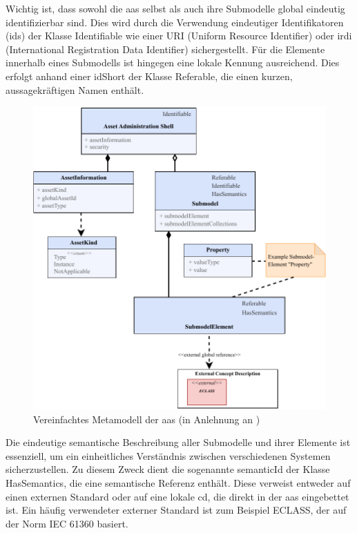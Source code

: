 Wichtig ist, dass sowohl die \acs{aas} selbst als auch ihre Submodelle global eindeutig identifizierbar sind.
Dies wird durch die Verwendung eindeutiger Identifikatoren (\acsp{id}) der Klasse Identifiable wie einer URI (Uniform Resource Identifier) oder \acs{irdi} (International Registration Data Identifier) sichergestellt.
Für die Elemente innerhalb eines Submodells ist hingegen eine lokale Kennung ausreichend. 
Dies erfolgt anhand einer idShort der Klasse Referable, die einen kurzen, aussagekräftigen Namen enthält.

\newpage
\begin{figure}[htbp]
    \centering
    \includegraphics[width=1\textwidth]{Bilder/Metamodell/MetamodellFarbig.pdf}
    \caption[Vereinfachtes Metamodell der \acs{aas}]{Vereinfachtes Metamodell der \acs{aas} (in Anlehnung an \cite{SpezifikationPart1})}
    \label{fig:MetamodellAAS}
\end{figure}

Die eindeutige semantische Beschreibung aller Submodelle und ihrer Elemente ist essenziell, um ein einheitliches Verständnis zwischen verschiedenen Systemen sicherzustellen.
Zu diesem Zweck dient die sogenannte semanticId der Klasse HasSemantics, die eine semantische Referenz enthält.
Diese verweist entweder auf einen externen Standard oder auf eine lokale \ac{cd}, die direkt in der \acs{aas} eingebettet ist.
Ein häufig verwendeter externer Standard ist zum Beispiel ECLASS, der auf der Norm IEC 61360 \cite{ECLASSIEC61360} basiert.

